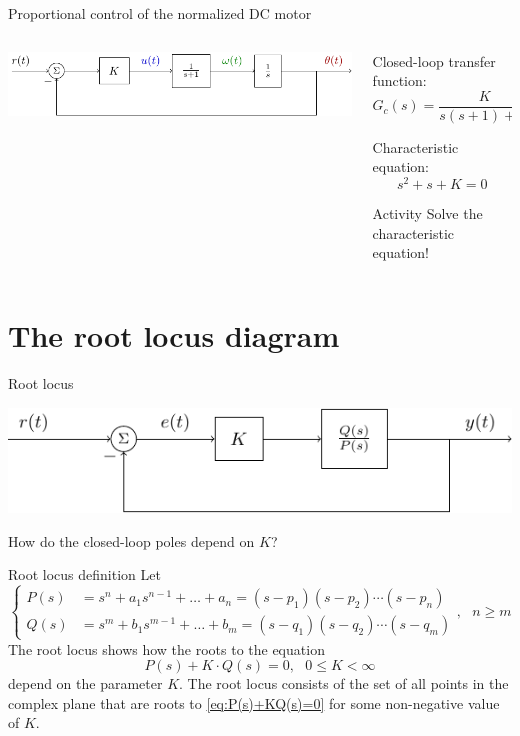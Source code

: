 \documentclass[presentation,aspectratio=169, usenames, dvipsnames]{beamer}
\begin{document}
\begin{frame}[label={sec:org8d7193f}]{Proportional control of the normalized DC motor}
\begin{columns}
\begin{column}{0.5\columnwidth}
\begin{center}
 \includegraphics[width=1.0\linewidth]{../../figures/block-DC-feedback}
\end{center}
\end{column}

\begin{column}{0.5\columnwidth}
Closed-loop transfer function:
\[ G_c(s) = \frac{K}{s(s+1) + K}\]

Characteristic equation:
\[ s^2 + s + K = 0\]

\alert{Activity} Solve the characteristic equation!
\end{column}
\end{columns}
\end{frame}

\section{The root locus diagram}
\label{sec:orgd20445b}

\begin{frame}[label={sec:org4b8951d}]{Root locus}
\begin{center}
 \includegraphics[width=1.0\linewidth]{../../figures/block-rlocus}
\end{center}

\alert{How do the closed-loop poles depend on \(K\)?}
\end{frame}

\begin{frame}[label={sec:orga5e54d7}]{Root locus definition}
Let
\[\begin{cases} P(s)&=s^n+a_1s^{n-1}+\dots+a_n = (s-p_1)(s-p_2)\cdots(s-p_n)\\ 
Q(s)&=s^m+b_1s^{m-1}+\dots+b_m=(s-q_1)(s-q_2)\cdots(s-q_m) \end{cases},\ \ \ n\ge m \]
The root locus shows how the roots to the equation
\begin{equation}
\label{eq:P(s)+KQ(s)=0}
P(s)+K\cdot Q(s)=0,\ \ \ 0\le K<\infty
\end{equation}
depend on the parameter \(K\). The root locus consists of the set of all points in the complex plane that are roots to \eqref{eq:P(s)+KQ(s)=0} for some non-negative value of \(K\).
\end{frame}
\end{document}

